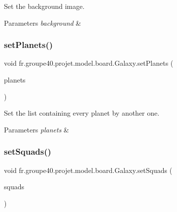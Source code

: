 Set the background image. 


\begin{DoxyParams}{Parameters}
{\em background} & \\
\hline
\end{DoxyParams}
\mbox{\label{classfr_1_1groupe40_1_1projet_1_1model_1_1board_1_1_galaxy_a7f400bf11202afef051fccbc9cc727a9}} 
\subsubsection{\texorpdfstring{set\+Planets()}{setPlanets()}}
{\footnotesize\ttfamily void fr.\+groupe40.\+projet.\+model.\+board.\+Galaxy.\+set\+Planets (\begin{DoxyParamCaption}\item[{Array\+List$<$ \hyperlink{classfr_1_1groupe40_1_1projet_1_1model_1_1planets_1_1_planet}{Planet} $>$}]{planets }\end{DoxyParamCaption})}



Set the list containing every planet by another one. 


\begin{DoxyParams}{Parameters}
{\em planets} & \\
\hline
\end{DoxyParams}
\mbox{\label{classfr_1_1groupe40_1_1projet_1_1model_1_1board_1_1_galaxy_a598d42d4b1e24f23d1e004a2e69c8959}} 
\subsubsection{\texorpdfstring{set\+Squads()}{setSquads()}}
{\footnotesize\ttfamily void fr.\+groupe40.\+projet.\+model.\+board.\+Galaxy.\+set\+Squads (\begin{DoxyParamCaption}\item[{Array\+List$<$ \hyperlink{classfr_1_1groupe40_1_1projet_1_1model_1_1ships_1_1_squad}{Squad} $>$}]{squads }\end{DoxyParamCaption})}



